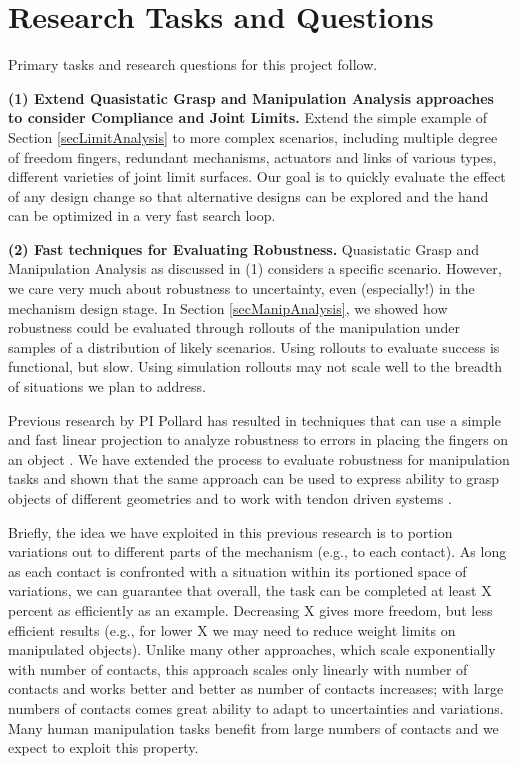 \section{Research Tasks and Questions}
  \label{secQuestions}

Primary tasks and research questions for this project follow.

\smallskip\noindent
{\bf (1) Extend Quasistatic Grasp and Manipulation Analysis approaches to consider Compliance and Joint Limits.}  Extend the simple example of Section \ref{secLimitAnalysis} to more complex scenarios, including multiple degree of freedom fingers, redundant mechanisms, actuators and links of various types, different varieties of joint limit surfaces.   Our goal is to quickly evaluate the effect of any design change so that alternative designs can be explored and the hand can be optimized in a very fast search loop.

\smallskip\noindent
{\bf (2) Fast techniques for Evaluating Robustness.}   Quasistatic Grasp and Manipulation Analysis as discussed in (1) considers a specific scenario.   However, we care very much about robustness to uncertainty, even (especially!) in the mechanism design stage.  In Section \ref{secManipAnalysis}, we showed how robustness could be evaluated through rollouts of the manipulation under samples of a distribution of likely scenarios.   Using rollouts to evaluate success is functional, but slow.    Using simulation rollouts may not scale well to the breadth of situations we plan to address.

Previous research by PI Pollard has resulted in techniques that can use a simple and fast linear projection to analyze robustness to errors in placing the fingers on an object \cite{pollard2004closure}.   We have extended the process to evaluate robustness for manipulation tasks \cite{Pollard:WAFR02}  and shown that the same approach can be used to express ability to grasp objects of different geometries \cite{pollard20045} and to work with tendon driven systems \cite{Li:graspDB07}.

Briefly, the idea we have exploited in this previous research is to portion variations out to different parts of the mechanism (e.g., to each contact).   As long as each contact is confronted with a situation within its portioned space of variations, we can guarantee that overall, the task can be completed at least X percent as efficiently as an example.   Decreasing X gives more freedom, but less efficient results (e.g., for lower X we may need to reduce weight limits on manipulated objects).   Unlike many other approaches, which scale exponentially with number of contacts, this approach scales only linearly with number of contacts and works better and better as number of contacts increases; with large numbers of contacts comes great ability to adapt to uncertainties and variations.   Many human manipulation tasks benefit from large numbers of contacts and we expect to exploit this property.

